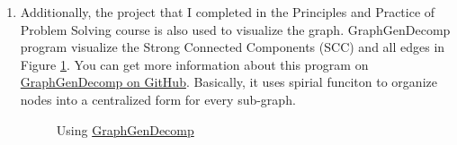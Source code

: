 \documentclass[12pt,a4paper]{article}
\makeatletter
\newtheorem*{solution}{Solution}
\theoremstyle{definition}
\renewenvironment{solution}[1][Solution] {\par\pushQED{\qed}\normalfont\topsep6\p@\@plus6\p@\relax\trivlist\item[\hskip\labelsep\bfseries#1\@addpunct{.}]\ignorespaces}{\popQED\endtrivlist\@endpefalse} \makeatother
\makeatother
\begin{document}
\begin{enumerate}
\begin{enumerate}
\begin{solution}
            Additionally, the project that I completed in the Principles and Practice of Problem Solving course is also used to visualize the graph. GraphGenDecomp program visualize the Strong Connected Components (SCC) and all edges in Figure \ref{fig:ggd}. You can get more information about this program on \href{https://github.com/LogCreative/GraphGenDecomp/blob/master/report/GraphGenDecomp.pdf}{GraphGenDecomp on GitHub}. Basically, it uses spirial funciton to organize nodes into a centralized form for every sub-graph.
            \begin{figure}[h]
                \caption{Using \href{https://github.com/LogCreative/GraphGenDecomp}{GraphGenDecomp}}
                \label{fig:ggd}
            \end{figure}
            
        \end{solution}
    \end{enumerate}	
\end{enumerate}
\end{document}
